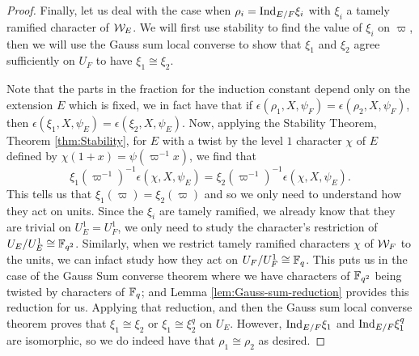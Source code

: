 \begin{proof}
  Finally, let us deal with the case when $\rho_i = \textrm{Ind}_{E/F} \xi_i$ with $\xi_i$ a tamely ramified character of $\mathcal{W}_E$.
  We will first use stability to find the value of $\xi_i$ on $\varpi$, then we will use the Gauss sum local converse to show that $\xi_1$ and $\xi_2$ agree sufficiently on $U_F$ to have $\xi_1 \cong \xi_2$.

  Note that the parts in the fraction for the induction constant depend only on the extension $E$ which is fixed, we in fact have that if $\epsilon(\rho_1,X,\psi_F) = \epsilon(\rho_2,X,\psi_F)$, then $\epsilon(\xi_1 ,X,\psi_E) = \epsilon(\xi_2, X,\psi_E)$.
  Now, applying the Stability Theorem, Theorem \ref{thm:Stability}, for $E$ with a twist by the level $1$ character $\chi$ of $E$ defined by $\chi(1+x) = \psi(\varpi^{-1} x)$, we find that
  \[\xi_1(\varpi^{-1})^{-1}\epsilon(\chi,X,\psi_E) = \xi_2(\varpi^{-1})^{-1} \epsilon(\chi,X,\psi_E).\]
  This tells us that $\xi_1(\varpi) = \xi_2(\varpi)$ and so we only need to understand how they act on units.
  Since the $\xi_i$ are tamely ramified, we already know that they are trivial on $U_E^1 = U_F^1$, we only need to study the character's restriction of $U_E/U_E^1 \cong \mathbb{F}_{q^2}$.
  Similarly, when we restrict tamely ramified characters $\chi$ of $\mathcal{W}_F$ to the units, we can infact study how they act on $U_F/U_F^1 \cong \mathbb{F}_q$.
  This puts us in the case of the Gauss Sum converse theorem where we have characters of $\mathbb{F}_{q^2}$ being twisted by characters of $\mathbb{F}_q$; and Lemma \ref{lem:Gauss-sum-reduction} provides this reduction for us.
  Applying that reduction, and then the Gauss sum local converse theorem proves that $\xi_1 \cong \xi_2$ or $\xi_1 \cong \xi_2^q$ on $U_E$.
  However, $\textrm{Ind}_{E/F} \xi_1$ and $\textrm{Ind}_{E/F} \xi_1^q$ are isomorphic, so we do indeed have that $\rho_1 \cong \rho_2$ as desired.

  
\end{proof}

